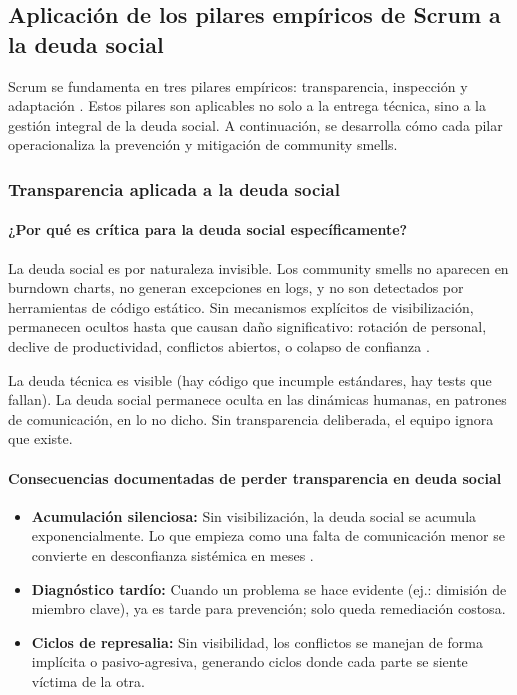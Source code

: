 \subsection{Aplicación de los pilares empíricos de Scrum a la deuda social}

Scrum se fundamenta en tres pilares empíricos: transparencia, inspección y adaptación \cite{schwaber2020scrum}. Estos pilares son aplicables no solo a la entrega técnica, sino a la gestión integral de la deuda social. A continuación, se desarrolla cómo cada pilar operacionaliza la prevención y mitigación de community smells.

\subsubsection{Transparencia aplicada a la deuda social}

\paragraph{¿Por qué es crítica para la deuda social específicamente?}

La deuda social es por naturaleza invisible. Los community smells no aparecen en burndown charts, no generan excepciones en logs, y no son detectados por herramientas de código estático. Sin mecanismos explícitos de visibilización, permanecen ocultos hasta que causan daño significativo: rotación de personal, declive de productividad, conflictos abiertos, o colapso de confianza \cite{saeeda2024nontechnicaldebt, caballero2022communitysmells}.

La deuda técnica es visible (hay código que incumple estándares, hay tests que fallan). La deuda social permanece oculta en las dinámicas humanas, en patrones de comunicación, en lo no dicho. Sin transparencia deliberada, el equipo ignora que existe.

\paragraph{Consecuencias documentadas de perder transparencia en deuda social}

\begin{itemize}
\item \textbf{Acumulación silenciosa:} Sin visibilización, la deuda social se acumula exponencialmente. Lo que empieza como una falta de comunicación menor se convierte en desconfianza sistémica en meses \cite{tamburri2015insights}.
\item \textbf{Diagnóstico tardío:} Cuando un problema se hace evidente (ej.: dimisión de miembro clave), ya es tarde para prevención; solo queda remediación costosa.
\item \textbf{Ciclos de represalia:} Sin visibilidad, los conflictos se manejan de forma implícita o pasivo-agresiva, generando ciclos donde cada parte se siente víctima de la otra.
\end{itemize}

